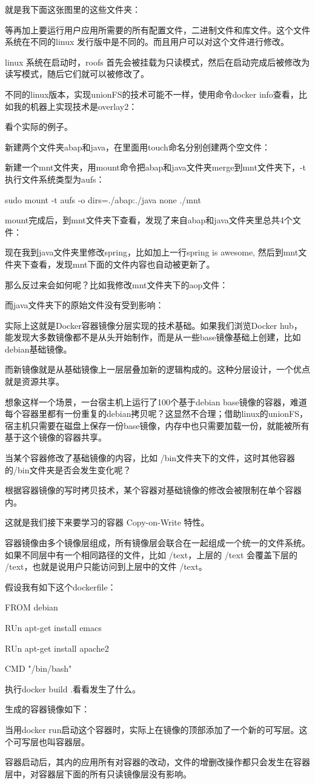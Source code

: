 就是我下面这张图里的这些文件夹：

等再加上要运行用户应用所需要的所有配置文件，二进制文件和库文件。这个文件系统在不同的linux 发行版中是不同的。而且用户可以对这个文件进行修改。

linux 系统在启动时，roofs 首先会被挂载为只读模式，然后在启动完成后被修改为读写模式，随后它们就可以被修改了。

不同的linux版本，实现unionFS的技术可能不一样，使用命令docker info查看，比如我的机器上实现技术是overlay2：

看个实际的例子。

新建两个文件夹abap和java，在里面用touch命名分别创建两个空文件：

新建一个mnt文件夹，用mount命令把abap和java文件夹merge到mnt文件夹下，-t执行文件系统类型为aufs：

sudo mount -t aufs -o dirs=./abap:./java none ./mnt

mount完成后，到mnt文件夹下查看，发现了来自abap和java文件夹里总共4个文件：

现在我到java文件夹里修改spring，比如加上一行spring is awesome, 然后到mnt文件夹下查看，发现mnt下面的文件内容也自动被更新了。

那么反过来会如何呢？比如我修改mnt文件夹下的aop文件：

而java文件夹下的原始文件没有受到影响：

实际上这就是Docker容器镜像分层实现的技术基础。如果我们浏览Docker hub，能发现大多数镜像都不是从头开始制作，而是从一些base镜像基础上创建，比如debian基础镜像。

而新镜像就是从基础镜像上一层层叠加新的逻辑构成的。这种分层设计，一个优点就是资源共享。

想象这样一个场景，一台宿主机上运行了100个基于debian base镜像的容器，难道每个容器里都有一份重复的debian拷贝呢？这显然不合理；借助linux的unionFS，宿主机只需要在磁盘上保存一份base镜像，内存中也只需要加载一份，就能被所有基于这个镜像的容器共享。

当某个容器修改了基础镜像的内容，比如 /bin文件夹下的文件，这时其他容器的/bin文件夹是否会发生变化呢？

根据容器镜像的写时拷贝技术，某个容器对基础镜像的修改会被限制在单个容器内。

这就是我们接下来要学习的容器 Copy-on-Write 特性。

容器镜像由多个镜像层组成，所有镜像层会联合在一起组成一个统一的文件系统。如果不同层中有一个相同路径的文件，比如 /text，上层的 /text 会覆盖下层的 /text，也就是说用户只能访问到上层中的文件 /text。

假设我有如下这个dockerfile：

FROM debian

RUn apt-get install emacs

RUn apt-get install apache2

CMD "/bin/bash"

执行docker build .看看发生了什么。

生成的容器镜像如下：

当用docker run启动这个容器时，实际上在镜像的顶部添加了一个新的可写层。这个可写层也叫容器层。

容器启动后，其内的应用所有对容器的改动，文件的增删改操作都只会发生在容器层中，对容器层下面的所有只读镜像层没有影响。

\newpage
